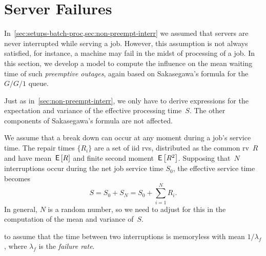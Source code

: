 \documentclass[stochastic-or.tex]{subfiles}
\begin{document}
\section{Server Failures}
\label{sec:preempt-interr-serv}

In~\cref{sec:setups-batch-proc,sec:non-preempt-interr} we assumed that servers are never interrupted while serving a job.
However, this assumption is not always satisfied, for instance, a machine may fail in the midst of processing of a job.
In this section, we develop a model
to compute the influence on the mean waiting time of such \emph{preemptive outages}, again based on Sakasegawa's formula for the $G/G/1$ queue.


Just as in~\cref{sec:non-preempt-interr}, we only have to derive expressions for the expectation and variance of the effective processing time~$S$. The other components of Sakasegawa's formula are not affected.


We assume that a break down can occur at any moment during a job's service time.
The repair times $\{R_i\}$ are a set of iid rvs, distributed as the common rv~$R$ and have mean $\,\mathsf{E}\left[R\right]$ and finite second moment $\,\mathsf{E}\left[R^{2}\right]$.
Supposing that~$N$ interruptions occur during the net job service time $S_0$, the effective service time becomes
\begin{equation}\label{eq:f1}
  S= S_0 + S_N = S_0 + \sum_{i=1}^N R_i.
\end{equation}
In general,  $N$ is a random number, so we need to adjust for this in the computation of the mean and variance of~$S$.


 to assume that the time between two interruptions is memoryless with mean $1/\lambda_f$, where $\lambda_f$ is the \emph{failure rate}.
\end{document}
